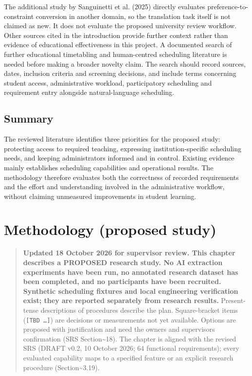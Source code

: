 \documentclass[
  11pt,a4paper,oneside]{report}
\begin{document}
The additional study by Sanguinetti et al. (2025) directly evaluates preference-to-constraint conversion in another domain, so the translation task itself is not claimed as new. It does not evaluate the proposed university review workflow. Other sources cited in the introduction provide further context rather than evidence of educational effectiveness in this project. A documented search of further educational timetabling and human-centred scheduling literature is needed before making a broader novelty claim. The search should record sources, dates, inclusion criteria and screening decisions, and include terms concerning student access, administrative workload, participatory scheduling and requirement entry alongside natural-language scheduling.

\section{Summary}
The reviewed literature identifies three priorities for the proposed study: protecting access to required teaching, expressing institution-specific scheduling needs, and keeping administrators informed and in control. Existing evidence mainly establishes scheduling capabilities and operational results. The methodology therefore evaluates both the correctness of recorded requirements and the effort and understanding involved in the administrative workflow, without claiming unmeasured improvements in student learning.

\hypertarget{methodology-proposed-study}{%
\chapter{Methodology (proposed
study)}\label{methodology-proposed-study}}

\begin{quote}
\textbf{Updated 18 October 2026 for supervisor review. This chapter describes a
PROPOSED research study. No AI extraction experiments have been run, no annotated research dataset has been completed, and no participants have been recruited. Synthetic scheduling fixtures and local engineering verification exist; they are reported separately from research results.}
Present-tense descriptions of procedures describe the plan.
Square-bracket items (\texttt{{[}TBD\ …{]}}) are decisions or
measurements not yet available. Options are proposed with justification
and need the owner\textquotesingle s and supervisor\textquotesingle s
confirmation (SRS Section\textasciitilde18). The chapter is aligned with
the revised SRS (DRAFT v0.2, 10 October 2026; 64 functional requirements); every evaluated capability maps to a specified
feature or an explicit research procedure (Section\textasciitilde3.19).
\end{quote}
\end{document}
